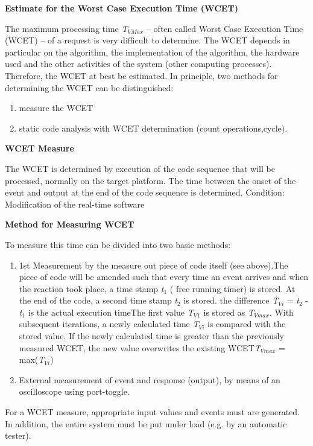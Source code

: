 \textbf{ Estimate for the Worst Case Execution Time (WCET)}

The maximum processing time \textit{T${}_{VMax}$} -- often called Worst Case Execution Time (WCET) -- of a request is very difficult to determine. The WCET depends in particular on the algorithm, the implementation of the algorithm, the hardware used and the other activities of the system (other computing processes). Therefore, the WCET at best be estimated. In principle, two methods for determining the WCET can be distinguished:

\begin{enumerate}
	\item  measure the WCET 
	\item  static code analysis with WCET determination (count operations,cycle).
\end{enumerate}

\textbf{WCET Measure}

The WCET is determined by execution of the code sequence that will be processed, normally on the target platform. The time between the onset of the event and output at the end of the code sequence is determined. Condition: Modification of the real-time software

\textbf{Method for Measuring WCET}

To measure this time can be divided into two basic methods:

\begin{enumerate}
	\item  1st Measurement by the measure out piece of code itself (see above).The piece of code will be amended such that every time an event arrives and when the reaction took place, a time stamp\textit{ t}${}_{1}$ ( free running timer) is stored. At the end of the code, a second time stamp\textit{ t}${}_{2}$ is stored. the difference \textit{T${}_{Vi}$} = \textit{t}${}_{2}$ - \textit{t}${}_{1}$ is the actual execution timeThe first value \textit{T${}_{V}$}${}_{1}$ is stored as \textit{T${}_{Vmax}$}. With subsequent iterations, a newly calculated time \textit{T${}_{Vi}$}  is compared with the stored value. If the newly calculated time is greater than the previously measured WCET, the new value overwrites the existing WCET\textit{T${}_{Vmax}$} = max(\textit{T${}_{Vi}$})
	\item   External measurement of event and response (output), by means of an oscilloscope using port-toggle.
\end{enumerate}

For a WCET measure, appropriate input values and events must are generated. In addition, the entire system must be put under load (e.g. by an automatic tester).

